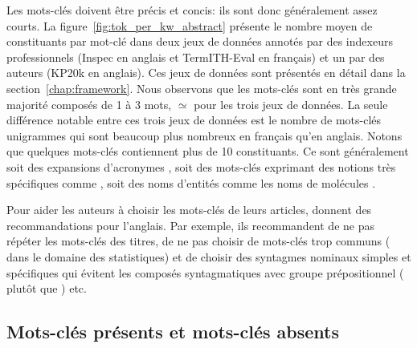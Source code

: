 Les mots-clés doivent être précis et concis: ils sont donc généralement assez courts. La figure~\ref{fig:tok_per_kw_abstract} présente le nombre moyen de constituants par mot-clé dans deux jeux de données annotés par des indexeurs professionnels (Inspec en anglais et TermITH-Eval en français) et un par des auteurs (KP20k en anglais). Ces jeux de données sont présentés en détail dans la section~\ref{chap:framework}.
%
Nous observons que les mots-clés sont en très grande majorité composés de 1 à 3 mots, $\simeq$ pour les trois jeux de données.
La seule différence notable entre ces trois jeux de données est le nombre de mots-clés unigrammes qui sont beaucoup plus nombreux en français qu'en anglais.
%
Notons que quelques mots-clés contiennent plus de 10 constituants. Ce sont généralement soit des expansions d'acronymes , soit des mots-clés exprimant des notions très spécifiques comme , soit des noms d'entités comme les noms de molécules .



Pour aider les auteurs à choisir les mots-clés de leurs articles, \citet{gbur_key_1995} donnent des recommandations pour l'anglais.
Par exemple, ils recommandent de ne pas répéter les mots-clés des titres, de ne pas choisir de mots-clés trop communs ( dans le domaine des statistiques) et de choisir des syntagmes nominaux simples et spécifiques qui évitent les composés syntagmatiques avec groupe prépositionnel ( plutôt que ) etc.




\subsection{Mots-clés présents et mots-clés absents}
\label{sub:mots-cles-present-et-absent}


